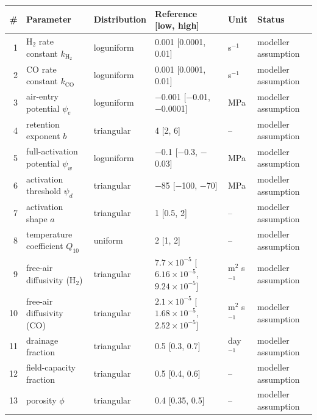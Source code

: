 \begin{tabular}{@{}rlp{1.9cm}p{4.1cm}p{1.4cm}p{3.1cm}@{}}
\toprule
\# & Parameter & Distribution & Reference [low, high] & Unit & Status \\
\midrule
1 & H$_2$ rate constant $k_{\mathrm{H_2}}$ & loguniform & 0.001 [0.0001, 0.01] & s$^{-1}$ & modeller assumption \\
2 & CO rate constant $k_{\mathrm{CO}}$ & loguniform & 0.001 [0.0001, 0.01] & s$^{-1}$ & modeller assumption \\
3 & air-entry potential $\psi_e$ & loguniform & $-$0.001 [$-$0.01, $-$0.0001] & MPa & modeller assumption \\
4 & retention exponent $b$ & triangular & 4 [2, 6] & -- & modeller assumption \\
5 & full-activation potential $\psi_w$ & loguniform & $-$0.1 [$-$0.3, $-$0.03] & MPa & modeller assumption \\
6 & activation threshold $\psi_d$ & triangular & $-$85 [$-$100, $-$70] & MPa & modeller assumption \\
7 & activation shape $a$ & triangular & 1 [0.5, 2] & -- & modeller assumption \\
8 & temperature coefficient $Q_{10}$ & uniform & 2 [1, 2] & -- & modeller assumption \\
9 & free-air diffusivity (H$_2$) & triangular & $7.7\times10^{-5}$ [$6.16\times10^{-5}$, $9.24\times10^{-5}$] & m$^2$ s$^{-1}$ & modeller assumption \\
10 & free-air diffusivity (CO) & triangular & $2.1\times10^{-5}$ [$1.68\times10^{-5}$, $2.52\times10^{-5}$] & m$^2$ s$^{-1}$ & modeller assumption \\
11 & drainage fraction & triangular & 0.5 [0.3, 0.7] & day$^{-1}$ & modeller assumption \\
12 & field-capacity fraction & triangular & 0.5 [0.4, 0.6] & -- & modeller assumption \\
13 & porosity $\phi$ & triangular & 0.4 [0.35, 0.5] & -- & modeller assumption \\
\bottomrule
\end{tabular}

